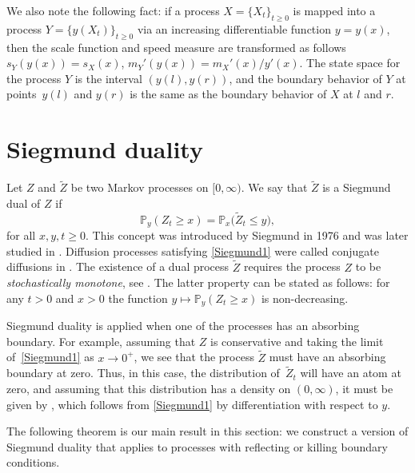 \documentclass[pdftex]{sigma}
\numberwithin{equation}{section}
\theoremstyle{definition}
\def\p{{\mathbb P}}
\begin{document}
We also note the following fact: if a process $X=\{X_t\}_{t\ge 0}$ is mapped into a process $Y=\{y(X_t)\}_{t\ge 0}$ via an increasing differentiable function $y=y(x)$, then the scale function and speed measure are transformed as follows
$
s_Y(y(x))=s_X(x)$, $ m_Y'(y(x))=m_X'(x)/y'(x)$.
The state space for the process $Y$ is the interval $(y(l), y(r))$, and the boundary behavior of $Y$ at points~$y(l)$ and $y(r)$ is the same as the boundary behavior of $X$ at $l$ and $r$.

 \section{Siegmund duality}\label{section_Siegmund}

Let $Z$ and $\widetilde Z$ be two Markov processes on $[0,\infty)$. We say that $\widetilde Z$ is a Siegmund dual of $Z$ if
\begin{equation}\label{Siegmund1}
\p_y(Z_t \ge x)=\p_x\bigl(\widetilde Z_t\le y\bigr),
\end{equation}
for all $x,y,t \ge 0$. This concept was introduced by Siegmund \cite{Siegmund_1976} in 1976 and was later studied in \cite{Clifford_1985,Cox_1984,Kolokoltsov_2011}. Diffusion processes satisfying \eqref{Siegmund1} were called conjugate diffusions in \cite{Toth_1996}. The existence of a dual process $\widetilde Z$ requires the process $Z$ to be {\it stochastically monotone}, see \cite{Clifford_1985,Siegmund_1976}. The latter property can be stated as follows: for any $t> 0$ and $x>0$ the function $y\mapsto \p_y(Z_t \ge x)$ is non-decreasing.

Siegmund duality is applied when one of the processes has an absorbing boundary. For example, assuming that $Z$ is conservative and taking the limit of~\eqref{Siegmund1} as $x \to 0^+$, we see that the process $\widetilde Z$ must have an absorbing boundary at zero. Thus, in this case, the distribution of~$\widetilde Z_t$ will have an atom at zero, and assuming that this distribution has a density on $(0,\infty)$, it must be given by
\smash{$p_t^{\widetilde Z}(x,y)=\partial_y \p_y(Z_t \ge x)$},
which follows from \eqref{Siegmund1} by differentiation with respect to $y$.

 The following theorem is our main result in this section: we construct a version of Siegmund duality that applies to processes with reflecting or killing boundary conditions.
\end{document}
